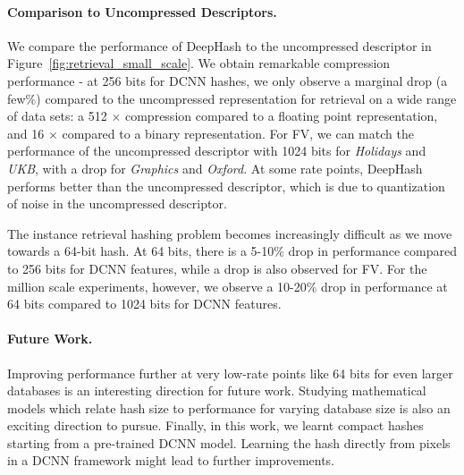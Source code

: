 \documentclass[10pt,twocolumn,letterpaper]{article}
\begin{document}
\paragraph{Comparison to Uncompressed Descriptors.}
We compare the performance of DeepHash to the uncompressed descriptor in Figure~\ref{fig:retrieval_small_scale}.
We obtain remarkable compression performance - at 256 bits for DCNN hashes, we only observe a marginal drop (a few$\%$) compared to the uncompressed representation for retrieval on a wide range of data sets: a 512 $\times$ compression compared to a floating point representation, and 16 $\times$ compared to a binary representation.
For FV, we can match the performance of the uncompressed descriptor with 1024 bits for {\it Holidays} and {\it UKB}, with a  drop for {\it Graphics} and {\it Oxford}. 
At some rate points, DeepHash performs better than the uncompressed descriptor, which is due to quantization of noise in the uncompressed descriptor.

The instance retrieval hashing problem becomes increasingly difficult as we move towards a 64-bit hash.
At 64 bits, there is a 5-10$\%$ drop in performance compared to 256 bits for DCNN features, while a drop is also observed for FV.
For the million scale experiments, however, we observe a 10-20$\%$ drop in performance at 64 bits compared to 1024 bits for DCNN features.

\vspace{-0.1em}
\paragraph{Future Work.} Improving performance further at very low-rate points like 64 bits for even larger databases is an interesting direction for future work.
Studying mathematical models which relate hash size to performance for varying database size is also an exciting direction to pursue.
Finally, in this work, we learnt compact hashes starting from a pre-trained DCNN model.
Learning the hash directly from pixels in a DCNN framework might lead to further improvements.
\end{document}
